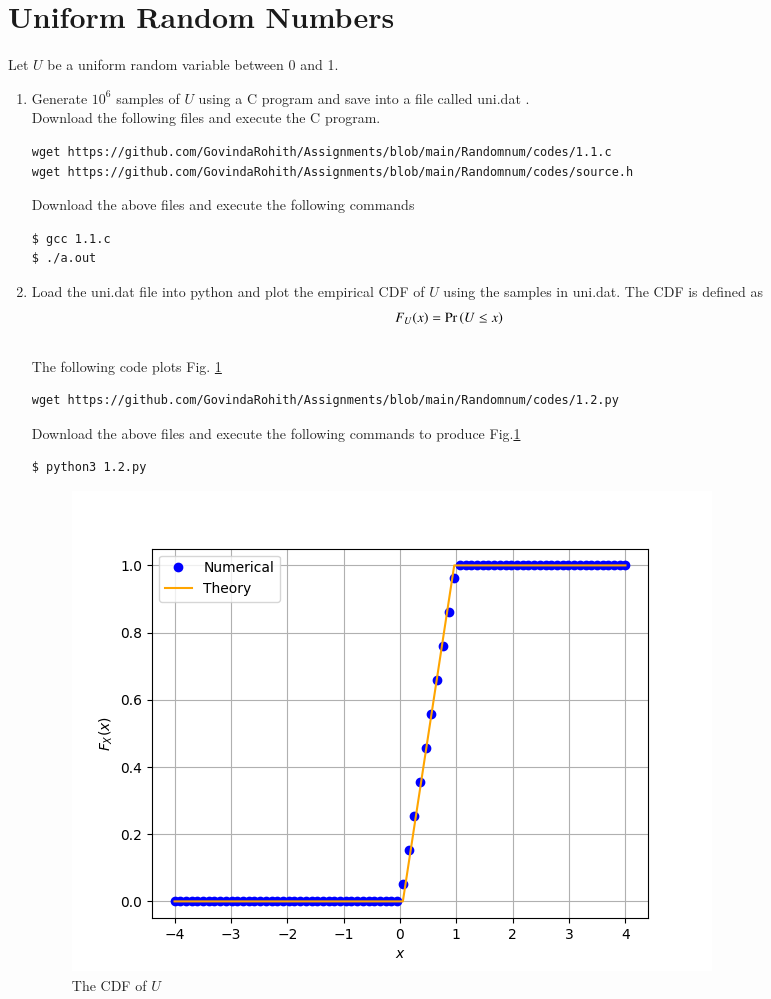\documentclass[journal,12pt,twocolumn]{IEEEtran}
\renewcommand\thesection{\arabic{section}}
\begin{document}
\section{Uniform Random Numbers}
Let $U$ be a uniform random variable between 0 and 1.
\begin{enumerate}[label=\thesection.\arabic*
,ref=\thesection.\theenumi]
\item Generate $10^6$ samples of $U$ using a C program and save into a file called uni.dat .
\\
\solution Download the following files and execute the  C program.
\begin{lstlisting}
wget https://github.com/GovindaRohith/Assignments/blob/main/Randomnum/codes/1.1.c
wget https://github.com/GovindaRohith/Assignments/blob/main/Randomnum/codes/source.h
\end{lstlisting}
Download the above files and execute the following commands
\begin{lstlisting}
$ gcc 1.1.c
$ ./a.out
\end{lstlisting}
\item
Load the uni.dat file into python and plot the empirical CDF of $U$ using the samples in uni.dat. The CDF is defined as
\begin{align}
F_{U}(x) = \Pr\left(U \le x\right)
\end{align}
\\
\solution  The following code plots Fig. \ref{fig:1.2}
\begin{lstlisting}
wget https://github.com/GovindaRohith/Assignments/blob/main/Randomnum/codes/1.2.py
\end{lstlisting}
Download the above files and execute the following commands to produce Fig.\ref{fig:1.2}
\begin{lstlisting}
$ python3 1.2.py
\end{lstlisting}
\begin{figure}[!h]
\centering
\includegraphics[width=\columnwidth]{./figs/1.2.png}
\caption{The CDF of $U$}
\label{fig:1.2}
\end{figure}


\end{enumerate}
\end{document}
